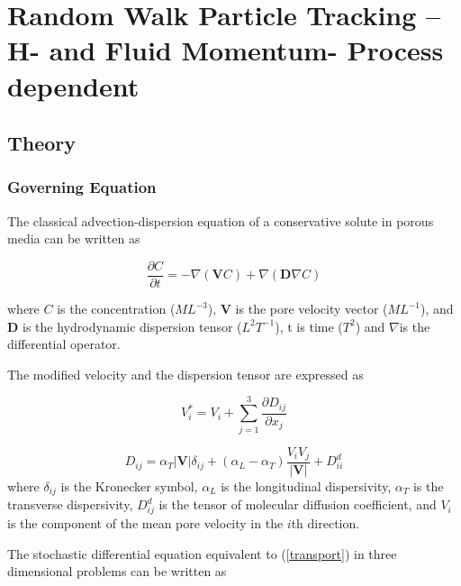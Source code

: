 \chapter[Random Walk Particle Tracking]{Random Walk Particle Tracking -- H- and Fluid Momentum- Process dependent}

\section{Theory}
\subsection{Governing Equation}\label{SS:GoverningEquation}
The classical advection-dispersion equation of a conservative solute in porous media can be written as \cite{jB79}

\begin{equation}\label{transport}
\frac{\partial C}{\partial t} = -\nabla(\textbf{V}C)+\nabla (\textbf{D} \nabla C)
\end{equation}

where $C$ is the concentration ($ML^{-3}$), $\textbf{V}$ is the pore velocity vector ($ML^{-1}$), and $\textbf{D}$ is the hydrodynamic dispersion tensor ($L^2T^{-1}$), t is time ($T^{2}$) and $ \nabla $is the differential operator.

The modified velocity \cite{wK86} and the dispersion tensor \cite{jB79} are expressed as

\begin{equation}\label{ModifiedVelocity}
V _i^* = V _i + \sum_{j=1}^{3}\frac{\partial D _{ij}}{\partial x _j}
\end{equation}

\begin{equation}\label{DispersionTensor}
D _{ij} = \alpha _T |\textbf{V}|\delta _{ij} + (\alpha _L - \alpha _T)\frac {V _i V _j}{|\textbf{V}|} + D^d _{ii}
\end{equation}
where $\delta _{ij}$ is the Kronecker symbol, $\alpha _L$ is the longitudinal dispersivity, $\alpha _T$ is the transverse dispersivity, $D^d _{ij}$ is the tensor of molecular diffusion coefficient, and $V _i$ is the component of the mean pore velocity in the $i$th direction.

The stochastic differential equation equivalent to (\ref{transport}) in three dimensional problems can be written as \cite{aT90,eL96,wK88}

